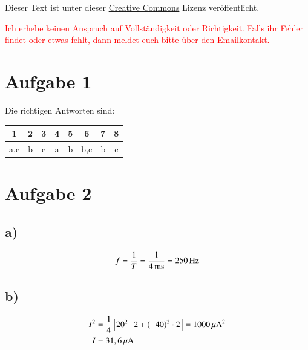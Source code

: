 




\maketitle

Dieser Text ist unter dieser \href{http://creativecommons.org/licenses/by-nc-sa/4.0/}{Creative Commons} Lizenz veröffentlicht.

\textcolor{red}{Ich erhebe keinen Anspruch auf Vollständigkeit oder Richtigkeit. Falls ihr Fehler findet oder etwas fehlt, dann meldet euch bitte über den Emailkontakt.}

\tableofcontents


\newpage



\section{Aufgabe 1}

Die richtigen Antworten sind:


\begin{center}
	\begin{tabular}{c|c|c|c|c|c|c|c}
		1 & 2 & 3 & 4 & 5 & 6 & 7 & 8 \\ 
		\hline a,c & b & c & a & b & b,c & b & c \\  
	\end{tabular} 
\end{center}


\section{Aufgabe 2}


\subsection*{a)}

\begin{align*}
f = \frac{1}{T} = \frac{1}{\unit[4]{ms}} = \unit[250]{Hz}
\end{align*}


\subsection*{b)}

\begin{align*}
I^2 &= \frac{1}{4} \left[ 20^2 \cdot 2 + (-40)^2 \cdot 2 \right] = \unit[1000]{\mu A^2} \\
I &= \unit[31,6]{\mu A}
\end{align*}


